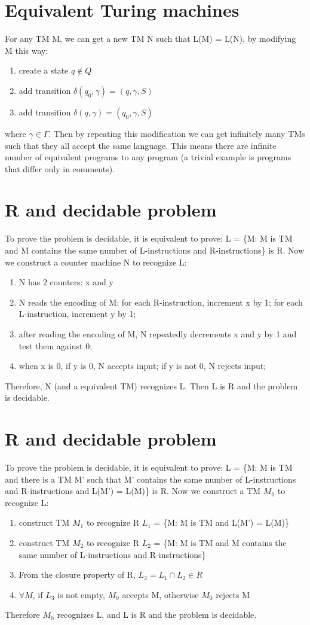 \documentclass{article}
\begin{document}
\section{Equivalent Turing machines}
For any TM M, we can get a new TM N such that L(M) = L(N), by modifying M this
way:
\begin{enumerate}
  \item create a state $q \notin Q$
  \item add transition $\delta(q_0, \gamma) = (q, \gamma, S)$
  \item add transition $\delta(q, \gamma) = (q_0, \gamma, S)$
\end{enumerate}
where $\gamma \in \Gamma$. Then by repeating this modification we can get
infinitely many TMs such that they all accept the same language. This means
there are infinite number of equivalent programs to any program (a trivial
example is programs that differ only in comments).

\section{R and decidable problem}
To prove the problem is decidable, it is equivalent to prove:
L = \{M: M is TM and M contains the same number of L-instructions and
R-instructions\} is R. Now we construct a counter machine N to recognize L:
\begin{enumerate}
  \item N has 2 counters: x and y
  \item N reads the encoding of M: for each R-instruction, increment x by 1; for
  each L-instruction, increment y by 1;
  \item after reading the encoding of M, N repeatedly decrements x and y by 1
  and test them against 0;
  \item when x is 0, if y is 0, N accepts input; if y is not 0, N rejects input;
\end{enumerate}
Therefore, N (and a equivalent TM) recognizes L. Then L is R and the problem is
decidable.

\section{R and decidable problem}
To prove the problem is decidable, it is equivalent to prove:
L = \{M: M is TM and there is a TM M' such that M' contains the same number of
L-instructions and R-instructions and L(M') = L(M)\} is R. Now we construct a TM
$M_0$ to recognize L:
\begin{enumerate}
  \item construct TM $M_1$ to recognize R $L_1$ = \{M: M is TM and L(M') =
  L(M)\}
  \item construct TM $M_2$ to recognize R $L_2$ = \{M: M is TM and M contains
  the same number of L-instructions and R-instructions\}
  \item From the closure property of R, $L_3 = L_1 \cap L_2 \in R$
  \item $\forall M$, if $L_3$ is not empty, $M_0$ accepts M, otherwise $M_0$
  rejects M
\end{enumerate}
Therefore $M_0$ recognizes L, and L is R and the problem is decidable.
\end{document}

